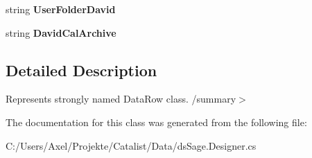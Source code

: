 \begin{DoxyCompactItemize}
\item 
string {\bfseries User\+Folder\+David}\hypertarget{class_products_1_1_data_1_1ds_sage_1_1_user_row_ac07d6151a7f0e4778f07fe0ecbefab3d}{}\label{class_products_1_1_data_1_1ds_sage_1_1_user_row_ac07d6151a7f0e4778f07fe0ecbefab3d}

\item 
string {\bfseries David\+Cal\+Archive}\hypertarget{class_products_1_1_data_1_1ds_sage_1_1_user_row_a36f75152b61a3add07bd5a86c39db08c}{}\label{class_products_1_1_data_1_1ds_sage_1_1_user_row_a36f75152b61a3add07bd5a86c39db08c}

\end{DoxyCompactItemize}


\subsection{Detailed Description}
Represents strongly named Data\+Row class. /summary$>$ 

The documentation for this class was generated from the following file\+:\begin{DoxyCompactItemize}
\item 
C\+:/\+Users/\+Axel/\+Projekte/\+Catalist/\+Data/ds\+Sage.\+Designer.\+cs\end{DoxyCompactItemize}
